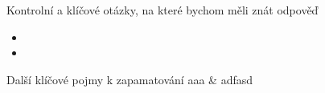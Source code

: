 \newpage
\onecolumn
\begin{boxotazky}{Kontrolní a klíčové otázky, na které bychom měli znát odpověď}
	\begin{itemize}
		\item 
		\item 
		
	\end{itemize}
\end{boxotazky}

\begin{boxslovnik}{Další klíčové pojmy k zapamatování}
	aaa & adfasd \\
	
\end{boxslovnik}
\twocolumn